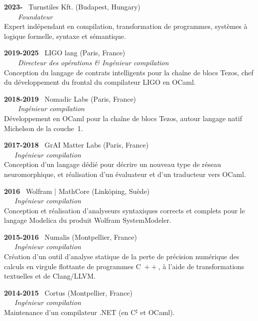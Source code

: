 \documentclass[a4paper,11pt]{article}
\newcommand{\cpp}{\mbox{C \hspace*{-2.5mm} \raise 0.7mm \hbox{${\scriptscriptstyle ++}$}}}
\begin{document}
\noindent\textbf{2023-} \ \textsf{Turnstiles Kft.} (Budapest,
Hungary)\\ \ \ \ \ \emph{Foundateur}\\
Expert indépendant en compilation, transformation de programmes,
systèmes à logique formelle, syntaxe et sémantique.

\bigskip

\noindent\textbf{2019-2025} \ \textsf{LIGO lang} (Paris,
France)\\ \ \ \ \ \emph{Directeur des opérations \& Ingénieur
compilation}\\ Conception du langage de contrats intelligents pour la
chaîne de blocs Tezos, chef du développement du frontal du compilateur
LIGO en OCaml.

\bigskip

\noindent\textbf{2018-2019} \ \textsf{Nomadic Labs} (Paris,
France)\\ \ \ \ \ \emph{Ingénieur compilation}\\ Développement en
OCaml pour la chaîne de blocs Tezos, autour langage natif Michelson de
la couche~1.

\bigskip

\noindent\textbf{2017-2018} \ \textsf{GrAI Matter Labs} (Paris,
France)\\ \ \ \ \emph{Ingénieur compilation}\\ Conception d'un langage
dédié pour décrire un nouveau type de réseau neuromorphique, et
réalisation d'un évaluateur et d'un traducteur vers OCaml.

\newpage

\noindent\textbf{2016} \ \textsf{Wolfram | MathCore} (Link\"oping,
Suède)\\ \ \ \ \emph{Ingénieur compilation}\\ Conception et
réalisation d'analyseurs syntaxiques corrects et complets pour le
langage Modelica du produit Wolfram SystemModeler.

\bigskip

\noindent\textbf{2015-2016} \ \textsf{Numalis} (Montpellier,
France)\\ \ \ \ \emph{Ingénieur compilation}\\ Création d'un outil
d'analyse statique de la perte de précision numérique des calculs en
virgule flottante de programmes \cpp{}, à l'aide de
transformations textuelles et de Clang/LLVM.

\bigskip

\noindent\textbf{2014-2015} \ \textsf{Cortus} (Montpellier,
France)\\ \ \ \ \emph{Ingénieur compilation}\\ Maintenance d'un
compilateur .NET (en C$^\sharp$ et OCaml).
\end{document}
